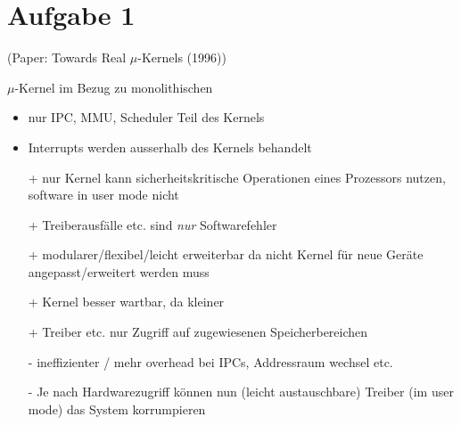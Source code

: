


\section*{Aufgabe 1}
(Paper: Towards Real \(\mu\)-Kernels (1996))

\(\mu\)-Kernel im Bezug zu monolithischen

\begin{itemize}
  \item nur IPC, MMU, Scheduler Teil des Kernels
  \item Interrupts werden ausserhalb des Kernels behandelt
  \item[+] nur Kernel kann sicherheitskritische Operationen eines Prozessors nutzen, software in user mode nicht
  \item[+] Treiberausfälle etc. sind \emph{nur} Softwarefehler
  \item[+] modularer/flexibel/leicht erweiterbar da nicht Kernel für neue Geräte angepasst/erweitert werden muss
  \item[+] Kernel besser wartbar, da kleiner
  \item[+] Treiber etc. nur Zugriff auf zugewiesenen Speicherbereichen
  \item[-] ineffizienter / mehr overhead bei IPCs, Addressraum wechsel etc.
  \item[-] Je nach Hardwarezugriff können nun (leicht austauschbare) Treiber (im user mode) das System korrumpieren
\end{itemize}


